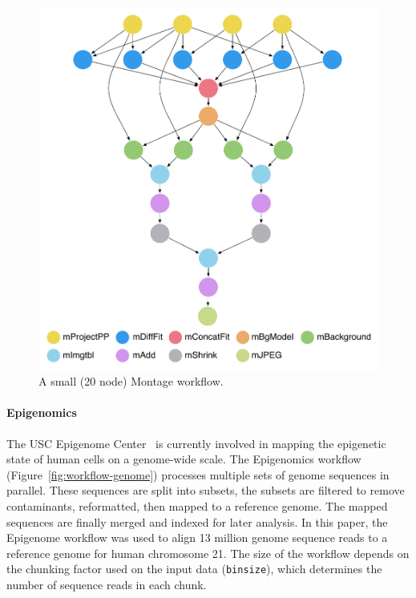 \documentclass[final,5p,times,twocolumn]{elsarticle}
\begin{document}
\begin{figure}[!htt]
	\centering
	\includegraphics[width=0.9\linewidth]{figures/workflow-montage}
	\caption{A small (20 node) Montage workflow.}
	\label{fig:workflow-montage}
\end{figure}


\paragraph{\textbf{Epigenomics}}
The USC Epigenome Center~\cite{genome} is currently involved in mapping the epigenetic 
state of human cells on a genome-wide scale. The Epigenomics workflow 
(Figure~\ref{fig:workflow-genome}) processes multiple sets of genome sequences in
parallel. These sequences are split into subsets, the subsets are filtered to remove
contaminants, reformatted, then mapped to a reference genome. The mapped sequences are
finally merged and indexed for later analysis. In this paper, the Epigenome
workflow was used to align 13 million genome sequence reads to a reference genome
for human chromosome 21. The size of the workflow depends on the 
chunking factor used on the input data (\texttt{binsize}), which determines
the number of sequence reads in each chunk.
\end{document}
